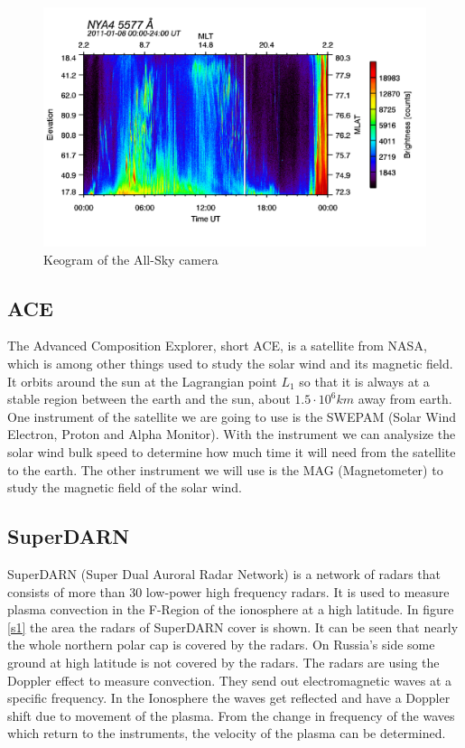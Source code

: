 \documentclass[10pt,a4paper]{article}
\begin{document}
\begin{figure}[h]
	\includegraphics[scale = 0.20]{am-0024-5577.png}
	\centering
	\caption{Keogram of the All-Sky camera}
	\label{a1}
\end{figure}

\subsection{ACE}

The Advanced Composition Explorer, short ACE, is a satellite from NASA, which is among other things used to study the solar wind and its magnetic field. It orbits around the sun at the Lagrangian point $L_1$ so that it is always at a stable region between the earth and the sun, about $1.5 \cdot 10^6 km$ away from earth. 
One instrument of the satellite we are going to use is the SWEPAM (Solar Wind Electron, Proton and Alpha Monitor). With the instrument we can analysize the solar wind bulk speed to determine how much time it will need from the satellite to the earth. 
The other instrument we will use is the MAG (Magnetometer) to study the magnetic field of the solar wind.


\subsection{SuperDARN}

SuperDARN (Super Dual Auroral Radar Network) is a network of radars that consists of more than 30 low-power high frequency radars. It is used to measure plasma convection in the F-Region of the ionosphere at a high latitude. In figure \ref{s1} the area the radars of SuperDARN cover is shown. It can be seen that nearly the whole northern polar cap is covered by the radars. On Russia's side some ground at high latitude is not covered by the radars.
The radars are using the Doppler effect to measure convection. They send out electromagnetic waves at a specific frequency. In the Ionosphere the waves get reflected and have a Doppler shift due to movement of the plasma. From the change in frequency of the waves which return to the instruments, the velocity of the plasma can be determined.
\end{document}
